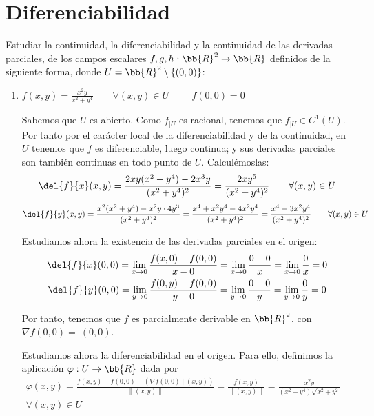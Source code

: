 \section{Diferenciabilidad}

\begin{ejercicio}
    Estudiar la continuidad, la diferenciabilidad y la continuidad de las derivadas parciales, de los campos escalares $f, g, h : \bb{R}^2 \to \bb{R}$ definidos de la siguiente forma, donde $U=\bb{R}^2\setminus \{(0,0)\}$:
    \begin{enumerate}
        \item $\displaystyle
            f(x,y)=\frac{x^2y}{x^2 + y^4} \qquad \forall (x,y)\in U
            \hspace{1cm}
            f(0,0)=0$
    
        Sabemos que $U$ es abierto. Como $f_{\big| U}$ es racional, tenemos que $f_{\big|U}\in C^1(U)$. Por tanto por el carácter local de la diferenciabilidad y de la continuidad, en $U$ tenemos que $f$ es diferenciable, luego continua; y sus derivadas parciales son también continuas en todo punto de $U$. Calculémoslas:
        \begin{equation*}
            \del{f}{x} (x,y) = \frac{2xy(x^2+y^4) - 2x^3y}{(x^2+y^4)^2}
            = \frac{2xy^5}{(x^2+y^4)^2} \qquad \forall (x,y)\in U
        \end{equation*}
        \begin{equation*}
            \del{f}{y} (x,y) = \frac{x^2(x^2+y^4) - x^2y\cdot 4y^3}{(x^2+y^4)^2}
            = \frac{x^4 + x^2y^4 -4x^2y^4}{(x^2+y^4)^2} 
            = \frac{x^4 -3x^2y^4}{(x^2+y^4)^2} \qquad \forall (x,y)\in U
        \end{equation*}
    
        Estudiamos ahora la existencia de las derivadas parciales en el origen:
        \begin{gather*}
            \del{f}{x}(0,0) = \lim_{x\to 0}\frac{f(x,0)-f(0,0)}{x-0} = \lim_{x\to 0}\frac{0-0}{x} = \lim_{x\to 0}\frac{0}{x} = 0 \\
            \del{f}{y}(0,0) = \lim_{y\to 0}\frac{f(0,y)-f(0,0)}{y-0} = \lim_{y\to 0}\frac{0-0}{y} = \lim_{y\to 0}\frac{0}{y} = 0
        \end{gather*}

        Por tanto, tenemos que $f$ es parcialmente derivable en $\bb{R}^2$, con $\nabla f(0,0) =~(0,0)$.
    
        Estudiamos ahora la diferenciabilidad en el origen. Para ello, definimos la aplicación $\varphi:U\to \bb{R}$ dada por
        \begin{multline*}
            \varphi(x,y) = \frac{f(x,y)-f(0,0) - (\nabla f(0,0)\mid (x,y))}{\|(x,y)\|} = \frac{f(x,y)}{\|(x,y)\|} = \frac{x^2y}{(x^2+y^4)\sqrt{x^2+y^2}} \qquad\\ \forall (x,y)\in U
        \end{multline*}


\end{enumerate}
\end{ejercicio}

